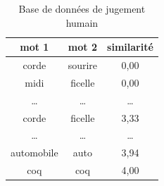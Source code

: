 \documentclass[11pt,french,french]{article}
\begin{document}
\begin{table}
\begin{center}
\begin{tabular}{|c|c|c|}
    \hline
    mot 1 & mot 2 & similarité  \tabularnewline
    \hline
    corde & sourire & 0,00   \tabularnewline
    midi & ficelle & 0,00   \tabularnewline
    \dots & \dots & \dots   \tabularnewline
    corde & ficelle & 3,33   \tabularnewline
    \dots & \dots & \dots   \tabularnewline
    automobile & auto & 3,94   \tabularnewline
    coq & coq & 4,00   \tabularnewline
    \hline
 \end{tabular}
\captionsetup{margin=0cm,format=hang,justification=justified}
\caption{Base de données de jugement humain}\label{table:human_judgement}
\end{center}
\end{table}

\newpage

\nocite{*}
\end{document}
